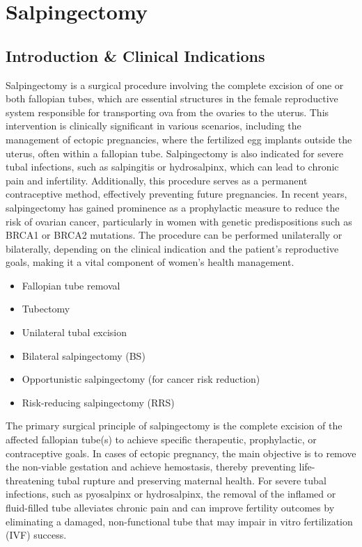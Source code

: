 \chapter{Salpingectomy}

\section*{Introduction \& Clinical Indications}
Salpingectomy is a surgical procedure involving the complete excision of one or both fallopian tubes, which are essential structures in the female reproductive system responsible for transporting ova from the ovaries to the uterus. This intervention is clinically significant in various scenarios, including the management of ectopic pregnancies, where the fertilized egg implants outside the uterus, often within a fallopian tube. Salpingectomy is also indicated for severe tubal infections, such as salpingitis or hydrosalpinx, which can lead to chronic pain and infertility. Additionally, this procedure serves as a permanent contraceptive method, effectively preventing future pregnancies. In recent years, salpingectomy has gained prominence as a prophylactic measure to reduce the risk of ovarian cancer, particularly in women with genetic predispositions such as BRCA1 or BRCA2 mutations. The procedure can be performed unilaterally or bilaterally, depending on the clinical indication and the patient's reproductive goals, making it a vital component of women's health management.

\begin{itemize}
  \item Fallopian tube removal
  \item Tubectomy
  \item Unilateral tubal excision
  \item Bilateral salpingectomy (BS)
  \item Opportunistic salpingectomy (for cancer risk reduction)
  \item Risk-reducing salpingectomy (RRS)
\end{itemize}

The primary surgical principle of salpingectomy is the complete excision of the affected fallopian tube(s) to achieve specific therapeutic, prophylactic, or contraceptive goals. In cases of ectopic pregnancy, the main objective is to remove the non-viable gestation and achieve hemostasis, thereby preventing life-threatening tubal rupture and preserving maternal health. For severe tubal infections, such as pyosalpinx or hydrosalpinx, the removal of the inflamed or fluid-filled tube alleviates chronic pain and can improve fertility outcomes by eliminating a damaged, non-functional tube that may impair in vitro fertilization (IVF) success.

